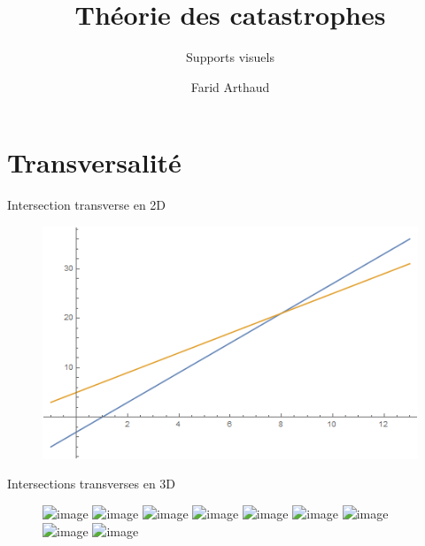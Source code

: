 \documentclass[compress, usepdftitle=false]{beamer}
\author{Farid Arthaud}
\title{Théorie des catastrophes}
\subtitle{Supports visuels}
\date{}
\institute{TIPE ENS 2018}
\theoremstyle{definition}
\begin{document}
\frame{\titlepage}

\frame{\tableofcontents}

\section{Transversalité}
\begin{frame}{Intersection transverse en 2D}
    \begin{figure}\includegraphics[keepaspectratio, height=0.8\textheight, width=\linewidth]{images/2DTransverse.png}\end{figure}
\end{frame}
\begin{frame}{Intersections transverses en 3D}
    \begin{figure}\includegraphics<1>[width=\linewidth, height=0.8\textheight, keepaspectratio]{images/3D_trans.png}
    \includegraphics<2>[width=\linewidth, height=0.8\textheight, keepaspectratio]{images/3D_non_trans.png}
    \includegraphics<3>[width=\linewidth, height=0.8\textheight, keepaspectratio]{images/var_trans.png}
    \includegraphics<4>[height=0.8\textheight,keepaspectratio]{images/saddle.png}
    \includegraphics<5>[width=\linewidth, height=0.8\textheight, keepaspectratio]{images/nontrans_rot9.png}
    \includegraphics<6>[width=\linewidth, height=0.8\textheight, keepaspectratio]{images/nontrans_rot13.png}
    \includegraphics<7>[width=\linewidth, height=0.8\textheight, keepaspectratio]{images/nontrans_rot17.png}
    \includegraphics<8>[width=\linewidth, height=0.8\textheight, keepaspectratio]{images/nontrans_rot19.png}
    \includegraphics<9>[width=\linewidth, height=0.8\textheight, keepaspectratio]{images/trans_fun.png}\end{figure}
\end{frame}
\end{document}
